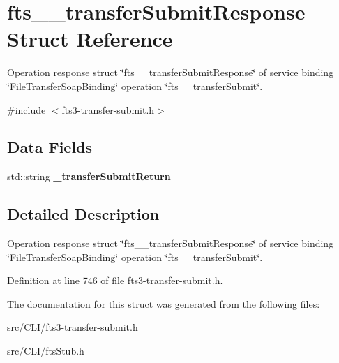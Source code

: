 \section{fts\_\-\_\-transferSubmitResponse Struct Reference}
\label{structfts____transferSubmitResponse}


Operation response struct \char`\"{}fts\_\-\_\-transferSubmitResponse\char`\"{} of service binding \char`\"{}FileTransferSoapBinding\char`\"{} operation \char`\"{}fts\_\-\_\-transferSubmit\char`\"{}.  




{\ttfamily \#include $<$fts3-\/transfer-\/submit.h$>$}

\subsection*{Data Fields}
\begin{DoxyCompactItemize}
\item 
std::string {\bfseries \_\-transferSubmitReturn}\label{structfts____transferSubmitResponse_a840c41e4d951b839c19977a0aa0af7bc}

\end{DoxyCompactItemize}


\subsection{Detailed Description}
Operation response struct \char`\"{}fts\_\-\_\-transferSubmitResponse\char`\"{} of service binding \char`\"{}FileTransferSoapBinding\char`\"{} operation \char`\"{}fts\_\-\_\-transferSubmit\char`\"{}. 

Definition at line 746 of file fts3-\/transfer-\/submit.h.



The documentation for this struct was generated from the following files:\begin{DoxyCompactItemize}
\item 
src/CLI/fts3-\/transfer-\/submit.h\item 
src/CLI/ftsStub.h\end{DoxyCompactItemize}
